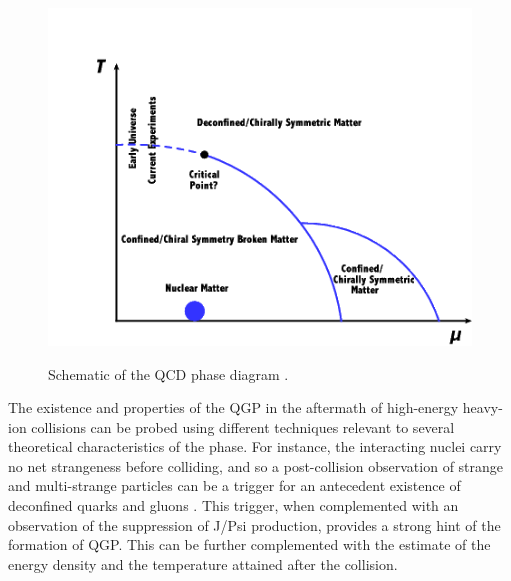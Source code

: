 \begin{figure}[h]
  \centering
  \includegraphics[width=5.5in]{figures/1742-6596-761-1-012066.png}\\
  \caption{Schematic of the QCD phase diagram \cite{1742-6596-761-1-012066}.}\label{fig:PhaseDiagram}
\end{figure}

The existence and properties of the QGP in the aftermath of high-energy heavy-ion collisions can be probed using different techniques relevant to several theoretical characteristics of the phase. For instance, the interacting nuclei  carry no net strangeness before colliding, and so a post-collision observation of strange and multi-strange particles can be a trigger for an antecedent existence of deconfined quarks and gluons \cite{1742-6596-455-1-012005}. This trigger, when complemented with an observation of the suppression of J/Psi production, provides a strong hint of the formation of QGP. This can be further complemented with the estimate of the energy density and the temperature attained after the collision.

